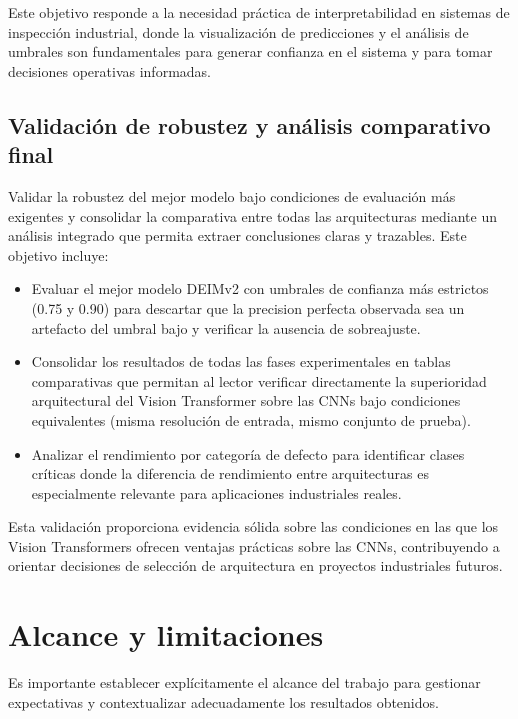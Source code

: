 Este objetivo responde a la necesidad práctica de interpretabilidad en sistemas de inspección industrial, donde la visualización de predicciones y el análisis de umbrales son fundamentales para generar confianza en el sistema y para tomar decisiones operativas informadas.

\subsection{Validación de robustez y análisis comparativo final}

Validar la robustez del mejor modelo bajo condiciones de evaluación más exigentes y consolidar la comparativa entre todas las arquitecturas mediante un análisis integrado que permita extraer conclusiones claras y trazables. Este objetivo incluye:

\begin{itemize}
    \item Evaluar el mejor modelo DEIMv2 con umbrales de confianza más estrictos (0.75 y 0.90) para descartar que la precision perfecta observada sea un artefacto del umbral bajo y verificar la ausencia de sobreajuste.

    \item Consolidar los resultados de todas las fases experimentales en tablas comparativas que permitan al lector verificar directamente la superioridad arquitectural del Vision Transformer sobre las CNNs bajo condiciones equivalentes (misma resolución de entrada, mismo conjunto de prueba).
    
    \item Analizar el rendimiento por categoría de defecto para identificar clases críticas donde la diferencia de rendimiento entre arquitecturas es especialmente relevante para aplicaciones industriales reales.
\end{itemize}

Esta validación proporciona evidencia sólida sobre las condiciones en las que los Vision Transformers ofrecen ventajas prácticas sobre las CNNs, contribuyendo a orientar decisiones de selección de arquitectura en proyectos industriales futuros.


\section{Alcance y limitaciones}

Es importante establecer explícitamente el alcance del trabajo para gestionar expectativas y contextualizar adecuadamente los resultados obtenidos.

